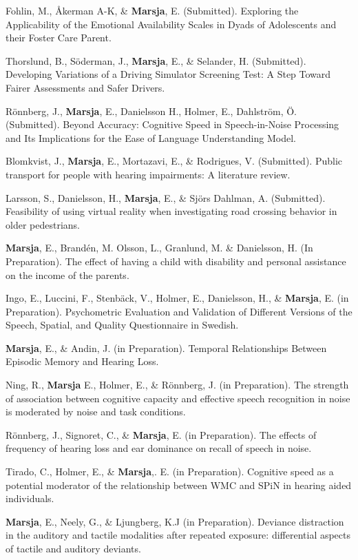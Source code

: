 \documentclass[]{article}
\begin{document}
Fohlin, M., Åkerman A-K, \& \textbf{Marsja}, E. (Submitted). Exploring
the Applicability of the Emotional Availability Scales in Dyads of
Adolescents and their Foster Care Parent.

Thorslund, B., Söderman, J., \textbf{Marsja}, E., \& Selander, H.
(Submitted). Developing Variations of a Driving Simulator Screening
Test: A Step Toward Fairer Assessments and Safer Drivers.

Rönnberg, J., \textbf{Marsja}, E., Danielsson H., Holmer, E., Dahlström,
Ö. (Submitted). Beyond Accuracy: Cognitive Speed in Speech-in-Noise
Processing and Its Implications for the Ease of Language Understanding
Model.

Blomkvist, J., \textbf{Marsja}, E., Mortazavi, E., \& Rodrigues, V.
(Submitted). Public transport for people with hearing impairments: A
literature review.

Larsson, S., Danielsson, H., \textbf{Marsja}, E., \& Sjörs Dahlman, A.
(Submitted). Feasibility of using virtual reality when investigating
road crossing behavior in older pedestrians.

\textbf{Marsja}, E., Brandén, M. Olsson, L., Granlund, M. \& Danielsson,
H. (In Preparation). The effect of having a child with disability and
personal assistance on the income of the parents.

Ingo, E., Luccini, F., Stenbäck, V., Holmer, E., Danielsson, H., \&
\textbf{Marsja}, E. (in Preparation). Psychometric Evaluation and
Validation of Different Versions of the Speech, Spatial, and Quality
Questionnaire in Swedish.

\textbf{Marsja}, E., \& Andin, J. (in Preparation). Temporal
Relationships Between Episodic Memory and Hearing Loss.

Ning, R., \textbf{Marsja} E., Holmer, E., \& Rönnberg, J. (in
Preparation). The strength of association between cognitive capacity and
effective speech recognition in noise is moderated by noise and task
conditions.

Rönnberg, J., Signoret, C., \& \textbf{Marsja}, E. (in Preparation). The
effects of frequency of hearing loss and ear dominance on recall of
speech in noise.

Tirado, C., Holmer, E., \& \textbf{Marsja},. E. (in Preparation).
Cognitive speed as a potential moderator of the relationship between WMC
and SPiN in hearing aided individuals.

\textbf{Marsja}, E., Neely, G., \& Ljungberg, K.J (in Preparation).
Deviance distraction in the auditory and tactile modalities after
repeated exposure: differential aspects of tactile and auditory
deviants.
\end{document}

